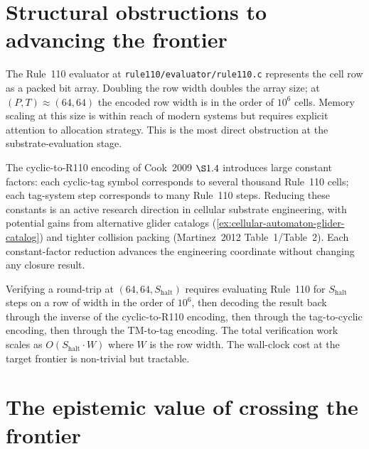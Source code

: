\section{Structural obstructions to advancing the frontier}
\label{sec:cook-frontier-obstructions}

\begin{remark}
\label{rem:cook-frontier-memory-scaling}
The Rule~110 evaluator at \texttt{rule110/evaluator/rule110.c} represents the cell row as a packed bit array. Doubling the row width doubles the array size; at $(P, T) \approx (64, 64)$ the encoded row width is in the order of $10^6$ cells. Memory scaling at this size is within reach of modern systems but requires explicit attention to allocation strategy. This is the most direct obstruction at the substrate-evaluation stage.
\end{remark}

\begin{remark}
\label{rem:cook-frontier-encoding-constants}
The cyclic-to-R110 encoding of Cook~2009 \(\S 1.4\) introduces large constant factors: each cyclic-tag symbol corresponds to several thousand Rule~110 cells; each tag-system step corresponds to many Rule~110 steps. Reducing these constants is an active research direction in cellular substrate engineering, with potential gains from alternative glider catalogs (\autoref{ex:cellular-automaton-glider-catalog}) and tighter collision packing (Martinez~2012 Table~1/Table~2). Each constant-factor reduction advances the engineering coordinate without changing any closure result.
\end{remark}

\begin{remark}
\label{rem:cook-frontier-roundtrip-cost}
Verifying a round-trip at $(64, 64, S_{\mathrm{halt}})$ requires evaluating Rule~110 for $S_{\mathrm{halt}}$ steps on a row of width in the order of $10^6$, then decoding the result back through the inverse of the cyclic-to-R110 encoding, then through the tag-to-cyclic encoding, then through the TM-to-tag encoding. The total verification work scales as $O(S_{\mathrm{halt}} \cdot W)$ where $W$ is the row width. The wall-clock cost at the target frontier is non-trivial but tractable.
\end{remark}

\section{The epistemic value of crossing the frontier}
\label{sec:cook-frontier-epistemic-value}


